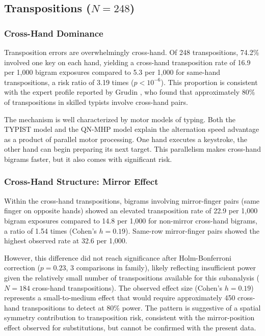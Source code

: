 \documentclass[12pt]{article}
\begin{document}
\subsection{Transpositions ($N = 248$)}

\subsubsection{Cross-Hand Dominance}

Transposition errors are overwhelmingly cross-hand. Of 248 transpositions, 74.2\% involved one key on each hand, yielding a cross-hand transposition rate of 16.9 per 1,000 bigram exposures compared to 5.3 per 1,000 for same-hand transpositions, a risk ratio of 3.19 times ($p < 10^{-6}$). This proportion is consistent with the expert profile reported by Grudin \citep{grudin1983}, who found that approximately 80\% of transpositions in skilled typists involve cross-hand pairs.

The mechanism is well characterized by motor models of typing. Both the TYPIST model \citep{john1996} and the QN-MHP model \citep{wu2008} explain the alternation speed advantage as a product of parallel motor processing. One hand executes a keystroke, the other hand can begin preparing its next target. This parallelism makes cross-hand bigrams faster, but it also comes with significant risk.

\subsubsection{Cross-Hand Structure: Mirror Effect}

Within the cross-hand transpositions, bigrams involving mirror-finger pairs (same finger on opposite hands) showed an elevated transposition rate of 22.9 per 1,000 bigram exposures compared to 14.8 per 1,000 for non-mirror cross-hand bigrams, a ratio of 1.54 times (Cohen's $h = 0.19$). Same-row mirror-finger pairs showed the highest observed rate at 32.6 per 1,000.

However, this difference did not reach significance after Holm-Bonferroni correction ($p = 0.23$, 3 comparisons in family), likely reflecting insufficient power given the relatively small number of transpositions available for this subanalysis ($N = 184$ cross-hand transpositions). The observed effect size (Cohen's $h = 0.19$) represents a small-to-medium effect that would require approximately 450 cross-hand transpositions to detect at 80\% power. The pattern is suggestive of a spatial symmetry contribution to transposition risk, consistent with the mirror-position effect observed for substitutions, but cannot be confirmed with the present data.
\end{document}
